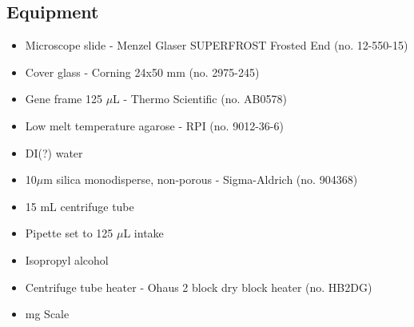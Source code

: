 \subsection{Equipment}
\begin{itemize}
    \item Microscope slide - Menzel Glaser SUPERFROST Frosted End (no. 12-550-15)
    \item Cover glass - Corning 24x50 mm (no. 2975-245)
    \item Gene frame 125 $\mu$L - Thermo Scientific (no. AB0578)
    \item Low melt temperature agarose - RPI (no. 9012-36-6)
    \item DI(?) water
    \item 10$\mu$m silica monodisperse, non-porous - Sigma-Aldrich (no. 904368)
    \item 15 mL centrifuge tube
    \item Pipette set to 125 $\mu$L intake
    \item Isopropyl alcohol
    \item Centrifuge tube heater - Ohaus 2 block dry block heater (no. HB2DG)
    \item mg Scale
\end{itemize}


